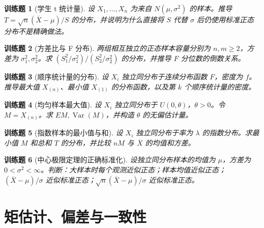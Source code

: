 \documentclass[UTF8,12pt,a4paper,fontset=fandol]{ctexbook}
\newtheorem{exercise}{训练题}[section]
\begin{document}
\begin{exercise}[学生 t 统计量]\label{q:B8.5}
设 $X_1,\ldots,X_n$ 为来自 $N(\mu,\sigma^2)$ 的样本。推导 $T=\sqrt n(\overline X-\mu)/S$ 的分布，并说明为什么直接将 $S$ 代替 $\sigma$ 后仍使用标准正态分布不是精确做法。\par{}\end{exercise}

\begin{exercise}[方差比与 F 分布]\label{q:B8.6}
两组相互独立的正态样本容量分别为 $n,m\ge2$，方差为 $\sigma_1^2,\sigma_2^2$。求 $(S_1^2/\sigma_1^2)/(S_2^2/\sigma_2^2)$ 的分布，并推导 $F$ 分位数的倒数关系。\par{}\end{exercise}

\begin{exercise}[顺序统计量的分布]\label{q:B8.7}
设 $X_i$ 独立同分布于连续分布函数 $F$，密度为 $f$。推导最大值 $X_{(n)}$、最小值 $X_{(1)}$ 的分布函数，以及第 $k$ 个顺序统计量的密度。\par{}\end{exercise}

\begin{exercise}[均匀样本最大值]\label{q:B8.8}
设 $X_i$ 独立同分布于 $U(0,\theta)$，$\theta>0$。令 $M=X_{(n)}$。求 $EM,\operatorname{Var}(M)$，并构造 $\theta$ 的无偏估计量。\par{}\end{exercise}

\begin{exercise}[指数样本的最小值与和]\label{q:B8.9}
设 $X_i$ 独立同分布于率为 $\lambda$ 的指数分布。求最小值 $M$ 和总和 $T$ 的分布，并比较 $nM$ 与 $\overline X$ 的均值和方差。\par{}\end{exercise}

\begin{exercise}[中心极限定理的正确标准化]\label{q:M-F-C13}
设独立同分布样本的均值为 $\mu$，方差为 $0<\sigma^2<\infty$。判断：大样本时每个观测近似正态；样本均值近似正态；$(\overline X-\mu)/\sigma$ 近似标准正态；$\sqrt n(\overline X-\mu)/\sigma$ 近似标准正态。\par{}\end{exercise}

\clearpage\section{矩估计、偏差与一致性}
\end{document}

